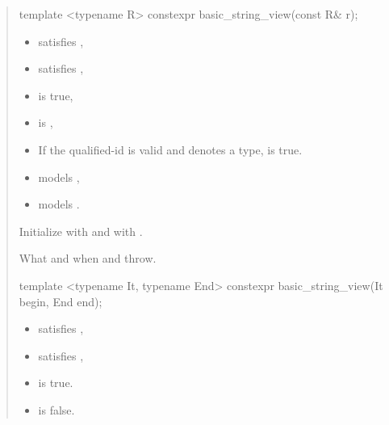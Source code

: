 \documentclass{wg21}
\begin{document}
\begin{quote}
\begin{addedblock}
\begin{itemdecl}
template <typename R>
constexpr basic_string_view(const R& r);

\end{itemdecl}

\begin{itemdescr}
    \constraints
    \begin{itemize}
        \item {} satisfies ,
        \item {} satisfies ,
        \item {} is true,
        \item {} is ,
        \item If the qualified-id  is valid and denotes a type,  is true.
    \end{itemize}
 
	\expects
	 \begin{itemize}
		\item {} models ,
		\item {} models .
	\end{itemize}

    \effects
    Initialize  with  and  with .


    \throws
    What and when  and  throw.



\end{itemdescr}

\begin{itemdecl}
template <typename It, typename End>
constexpr basic_string_view(It begin, End end);

\end{itemdecl}

\begin{itemdescr}
    \constraints
    \begin{itemize}
        \item {} satisfies ,
        \item {} satisfies ,
        \item {} is true.
        \item {} is false.
    \end{itemize}


\end{itemdescr}
\end{addedblock}
\end{quote}
\end{document}
